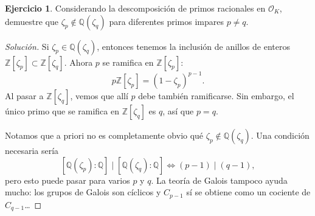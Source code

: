 \documentclass{article}
\newcounter{tarea}
\theoremstyle{definition}
\newtheorem{ejercicio}{Ejercicio}[tarea]
\newenvironment{solucion}{\begin{proof}[Solución]}{\end{proof}}
\newcommand{\ZZ}{\mathbb{Z}}
\newcommand{\QQ}{\mathbb{Q}}
\renewcommand{\O}{\mathcal{O}}
\begin{document}
\begin{ejercicio}
  Considerando la descomposición de primos racionales en $\O_K$,
  demuestre que $\zeta_p \notin \QQ (\zeta_q)$ para diferentes primos
  impares $p \ne q$.

  \ifdefined\solutions
  \begin{solucion}
    Si $\zeta_p \in \QQ (\zeta_q)$, entonces tenemos la inclusión de anillos de
    enteros $\ZZ [\zeta_p] \subset \ZZ [\zeta_q]$. Ahora $p$ se ramifica en
    $\ZZ [\zeta_p]$:
    $$p\ZZ [\zeta_p] = (1-\zeta_p)^{p-1}.$$
    Al pasar a $\ZZ [\zeta_q]$, vemos que allí $p$ debe también ramificarse.
    Sin embargo, el único primo que se ramifica en $\ZZ [\zeta_q]$ es $q$,
    así que $p = q$.

    Notamos que a priori no es completamente obvio qué
    $\zeta_p \notin \QQ (\zeta_q)$.  Una condición necesaria sería
    $$[\QQ (\zeta_p) : \QQ] \mid [\QQ (\zeta_q) : \QQ] \iff (p-1) \mid (q-1),$$
    pero esto puede pasar para varios $p$ y $q$. La teoría de Galois tampoco
    ayuda mucho: los grupos de Galois son cíclicos y $C_{p-1}$ sí se obtiene
    como un cociente de $C_{q-1}$\dots
  \end{solucion}
  \fi
\end{ejercicio}
\end{document}
